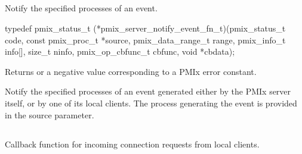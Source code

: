 \subsection{}

\summary

Notify the specified processes of an event.

\format

\cspecificstart
\begin{codepar}
typedef pmix_status_t (*pmix_server_notify_event_fn_t)(pmix_status_t code,
                                                       const pmix_proc_t *source,
                                                       pmix_data_range_t range,
                                                       pmix_info_t info[], size_t ninfo,
                                                       pmix_op_cbfunc_t cbfunc, void *cbdata);
\end{codepar}
\cspecificend

\begin{arglist}
\end{arglist}

Returns  or a negative value corresponding to a PMIx error constant.

\descr

Notify the specified processes of an event generated either by the PMIx server itself, or by one of its local clients.
The process generating the event is provided in the source parameter.


\subsection{}

\summary

Callback function for incoming connection requests from local clients.

\format

